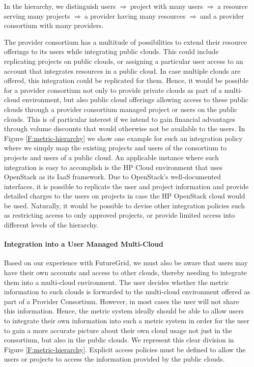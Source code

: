 \documentclass{tex/sig-alternate-2013}
\begin{document}
\newcommand{\ARROW}{$\Rightarrow~$}

In the hierarchy, we distinguish users \ARROW project with many users \ARROW a resource serving many projects \ARROW a provider having many resources \ARROW and a provider consortium with many providers.

The provider consortium has a multitude of possibilities to extend their resource offerings to its users while integrating public clouds. This could include replicating projects on public clouds, or assigning a particular user access to an account that integrates resources in a public cloud. In case multiple clouds are offered, this integration could be replicated for them. Hence, it would be possible for a provider consortium not only to provide private clouds as part of a multi-cloud environment, but also public cloud offerings allowing access to these public clouds through a provider consortium managed project or users on the public clouds. This is of particular interest if we intend to gain financial advantages through volume discounts that would otherwise not be available to the users.  In Figure \ref{F:metric-hierarchy} we show one example for such an integration policy where we simply map the existing projects and users of the consortium to projects and users of a public cloud. An applicable instance where such integration is easy to accomplish is the HP Cloud environment that uses OpenStack as its IaaS framework. Due to OpenStack's well-documented interfaces, it is possible to replicate the user and project information and provide detailed charges to the users on projects in case the HP OpenStack cloud would be used. Naturally, it would be possible to devise other integration policies such as restricting access to only approved projects, or provide limited access into different levels of the hierarchy.


\paragraph{Integration into a User Managed Multi-Cloud}

Based on our experience with FutureGrid, we must also be aware that users may have their own accounts and access to other clouds, thereby needing to integrate them into a multi-cloud environment. The user decides whether the metric information to such clouds is forwarded to the multi-cloud environment offered as part of a Provider Consortium. However, in most cases the user will not share this information. Hence, the metric system ideally should be able to allow users to integrate their own information into such a metric system in order for the user to gain a more accurate picture about their own cloud usage not just in the consortium, but also in the public clouds. We represent this clear division in Figure \ref{F:metric-hierarchy}. Explicit access policies must be defined to allow the users or projects to access the information provided by the public clouds.
\end{document}
